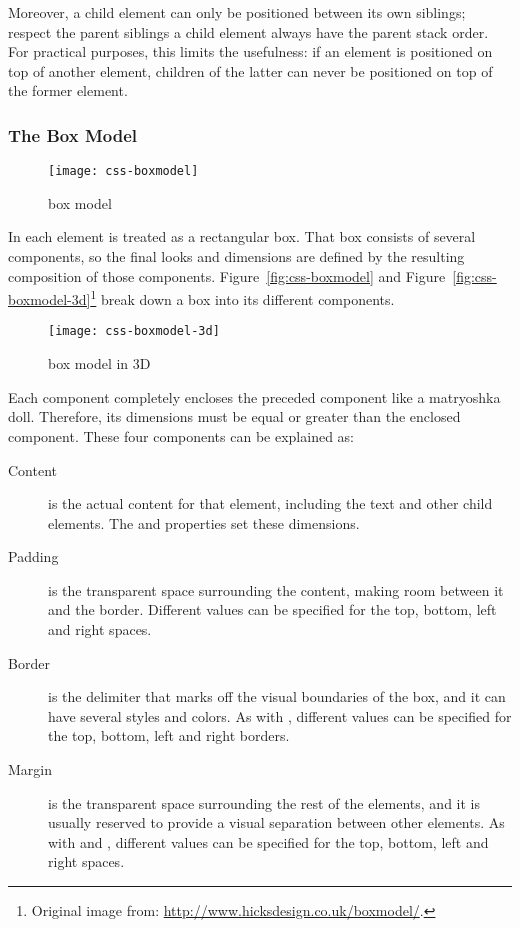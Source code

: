 Moreover, a child element can only be positioned between its own siblings; respect the parent siblings a child element always have the parent stack order.
For practical purposes, this limits the  usefulness: if an element is positioned on top of another element, children of the latter can never be positioned on top of the former element.


\subsubsection{The Box Model} %
\label{ssub:boxmodel}

\begin{wrapfigure}{r}{0.5\textwidth}
  \centering
    \texttt{[image: css-boxmodel]}
  \caption{ box model}
  \label{fig:css-boxmodel}
\end{wrapfigure}

In  each element is treated as a rectangular box.
That box consists of several components, so the final looks and dimensions are defined by the resulting composition of those components.
Figure~\vref{fig:css-boxmodel} and Figure~\vref{fig:css-boxmodel-3d}\footnote{Original image from: \url{http://www.hicksdesign.co.uk/boxmodel/}.} break down a box into its different components.

\begin{figure}[htbp]
  \centering
    \texttt{[image: css-boxmodel-3d]}
  \caption{ box model in 3D}
  \label{fig:css-boxmodel-3d}
\end{figure}

Each component completely encloses the preceded component like a matryoshka doll.
Therefore, its dimensions must be equal or greater than the enclosed component.
These four components can be explained as:

\begin{description}
  \item[Content] is the actual content for that element, including the text and other child elements.
  The  and   properties set these dimensions.
  \item[Padding] is the transparent space surrounding the content, making room between it and the border.
  Different values can be specified for the top, bottom, left and right spaces.
  \item[Border] is the delimiter that marks off the visual boundaries of the box, and it can have several styles and colors.
  As with , different values can be specified for the top, bottom, left and right borders.
  \item[Margin] is the transparent space surrounding the rest of the elements, and it is usually reserved to provide a visual separation between other elements.
  As with  and , different values can be specified for the top, bottom, left and right spaces.
\end{description}

